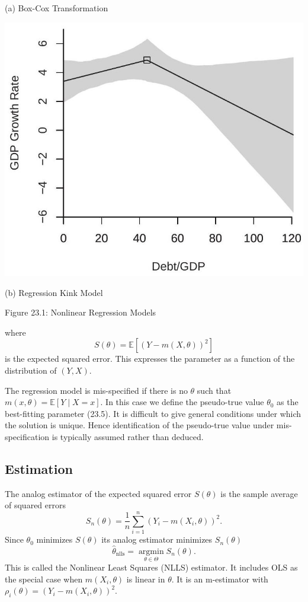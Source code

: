 \documentclass[10pt]{article}
\begin{document}
(a) Box-Cox Transformation

\includegraphics[max width=\textwidth]{2022_10_23_afe6a5896d8677a5cd30g-03(1)}

(b) Regression Kink Model

Figure 23.1: Nonlinear Regression Models

where
$$
S(\theta)=\mathbb{E}\left[(Y-m(X, \theta))^{2}\right]
$$
is the expected squared error. This expresses the parameter as a function of the distribution of $(Y, X)$.

The regression model is mis-specified if there is no $\theta$ such that $m(x, \theta)=\mathbb{E}[Y \mid X=x]$. In this case we define the pseudo-true value $\theta_{0}$ as the best-fitting parameter (23.5). It is difficult to give general conditions under which the solution is unique. Hence identification of the pseudo-true value under mis-specification is typically assumed rather than deduced.

\subsection{Estimation}
The analog estimator of the expected squared error $S(\theta)$ is the sample average of squared errors
$$
S_{n}(\theta)=\frac{1}{n} \sum_{i=1}^{n}\left(Y_{i}-m\left(X_{i}, \theta\right)\right)^{2} .
$$
Since $\theta_{0}$ minimizes $S(\theta)$ its analog estimator minimizes $S_{n}(\theta)$
$$
\widehat{\theta}_{\mathrm{nlls}}=\underset{\theta \in \Theta}{\operatorname{argmin}} S_{n}(\theta) .
$$
This is called the Nonlinear Least Squares (NLLS) estimator. It includes OLS as the special case when $m\left(X_{i}, \theta\right)$ is linear in $\theta$. It is an m-estimator with $\rho_{i}(\theta)=\left(Y_{i}-m\left(X_{i}, \theta\right)\right)^{2}$.
\end{document}
